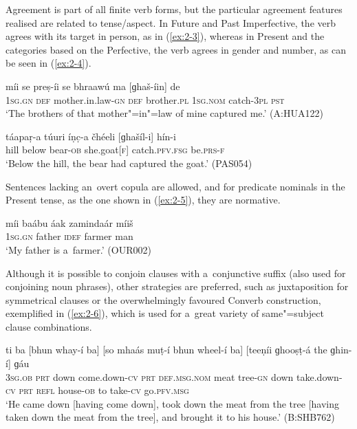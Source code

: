 Agreement is part of all finite verb forms, but the particular agreement features realised are related to tense/aspect. In Future and Past Imperfective, the verb agrees with its target in person, as in (\ref{ex:2-3}), whereas in Present and the categories based on the Perfective, the verb agrees in gender and number, as can be seen in (\ref{ex:2-4}).

\begin{exe}
\ex
\label{ex:2-3}
\gll míi se preṣ-íi se bhraawú ma [ɡhaš-íin] de \\
\textsc{1sg.gn} \textsc{def} mother.in.law-\textsc{gn} \textsc{def} brother.\textsc{pl} \textsc{1sg.nom} catch-\textsc{3pl} \textsc{pst} \\
\glt `The brothers of that mother"=in"=law of mine captured me.' (A:HUA122)
\end{exe}

\begin{exe}
\ex
\label{ex:2-4}
\gll táapaṛ-a túuri íṇc̣-a čhéeli [ɡhašíl-i] hín-i \\ 
hill below bear-\textsc{ob} she.goat[\textsc{f}] catch.\textsc{pfv.fsg} be.\textsc{prs-f} \\
\glt `Below the hill, the bear had captured the goat.' (PAS054)
\end{exe}

Sentences lacking an~overt copula are allowed, and for predicate nominals in the Present tense, as the one shown in (\ref{ex:2-5}), they are normative.

\begin{exe}
\ex
\label{ex:2-5}
\gll míi baábu áak zamindaár míiš \\ 
\textsc{1sg.gn} father \textsc{idef} farmer man \\
\glt `My father is a~farmer.' (OUR002)
\end{exe}
Although it is possible to conjoin clauses with a~conjunctive suffix (also used for conjoining noun phrases), other strategies are preferred, such as juxtaposition for symmetrical clauses or the overwhelmingly favoured Converb construction, exemplified in (\ref{ex:2-6}), which is used for a~great variety of same"=subject clause combinations.

\begin{exe}
\ex
\label{ex:2-6}
\gll ti ba [bhun whay-í ba] [so mhaás muṭ-í bhun wheel-í ba] [teeṇíi ɡhooṣṭ-á the ɡhin-í] ɡáu \\
\textsc{3sg.ob} \textsc{prt} down come.down-\textsc{cv} \textsc{prt} \textsc{def.msg.nom} meat tree-\textsc{gn} down take.down-\textsc{cv} \textsc{prt} \textsc{refl} house-\textsc{ob} to take-\textsc{cv} go.\textsc{pfv.msg} \\
\glt `He came down [having come down], took down the meat from the tree [having taken down the meat from the tree], and brought it to his house.' (B:SHB762)
\end{exe}

